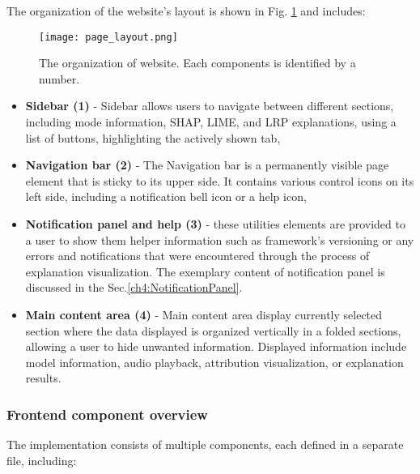 \documentclass[
    bindingoffset=5mm,  %
    footnoteindent=3mm, %
    hyphenation=true    %
]{src/wut-thesis}
\begin{document}
The organization of the website's layout is shown in Fig. \ref{fig:PageLayout} and includes:

\begin{figure}[h!] %
    \centering
    \texttt{[image: page\_layout.png]}
    \caption{The organization of website. Each components is identified by a number.}
    \label{fig:PageLayout}
\end{figure}

\begin{itemize}
    \item \textbf{Sidebar (1)} - Sidebar allows users to navigate between different sections, including mode
        information, SHAP, LIME, and LRP explanations, using a list of buttons, highlighting
        the actively shown tab,
    \item \textbf{Navigation bar (2)} - The Navigation bar is a permanently visible page element that is sticky
        to its upper side. It contains various control icons on its left side, including a notification
        bell icon or a help icon,
    \item \textbf{Notification panel and help (3)} - these utilities elements are provided
        to a user to show them helper information such as framework's versioning or any errors
        and notifications that were encountered through the process of explanation visualization.
        The exemplary content of notification panel is discussed in the Sec.\ref{ch4:NotificationPanel}. 
    \item \textbf{Main content area (4)} - Main content area display currently selected section
        where the data displayed is organized vertically in a folded sections, allowing a user
        to hide unwanted information. Displayed information include model information, audio playback,
        attribution visualization, or explanation results.
\end{itemize}

\subsubsection{Frontend component overview}

The implementation consists of multiple components,
each defined in a separate file, including:
\end{document}
